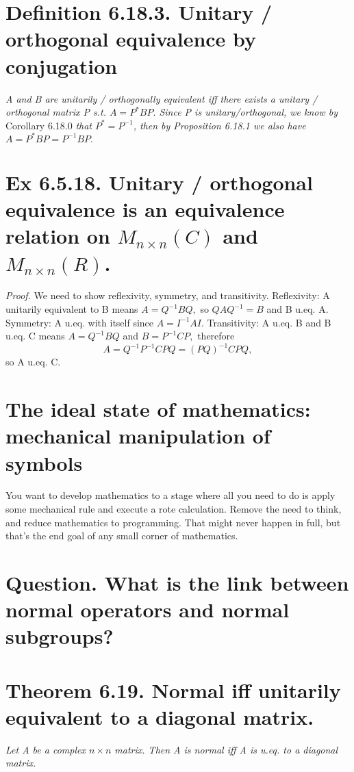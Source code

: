 \documentclass[12pt,english]{article}
\begin{document}
\section{Definition 6.18.3. Unitary / orthogonal equivalence by conjugation}

\emph{A and B are unitarily / orthogonally equivalent iff there exists
a unitary / orthogonal matrix P s.t. $A=P^{*}BP.$ Since P is unitary/orthogonal,
we know by }Corollary 6.18.0\emph{ that $P^{*}=P^{-1}$, then by Proposition
6.18.1 we also have $A=P^{*}BP=P^{-1}BP.$}

\section{Ex 6.5.18. Unitary / orthogonal equivalence is an equivalence relation
on $M_{n\times n}(C)$ and $M_{n\times n}(R)$. }

\emph{Proof. }We need to show reflexivity, symmetry, and transitivity.
Reflexivity: A unitarily equivalent to B means $A=Q^{-1}BQ,$ so $QAQ^{-1}=B$
and B u.eq. A. Symmetry: A u.eq. with itself since $A=I^{-1}AI.$
Transitivity: A u.eq. B and B u.eq. C means $A=Q^{-1}BQ$ and $B=P^{-1}CP,$
therefore
\[
A=Q^{-1}P^{-1}CPQ=(PQ)^{-1}CPQ,
\]
 so A u.eq. C.

\section{The ideal state of mathematics: mechanical manipulation of symbols}

You want to develop mathematics to a stage where all you need to do
is apply some mechanical rule and execute a rote calculation. Remove
the need to think, and reduce mathematics to programming. That might
never happen in full, but that's the end goal of any small corner
of mathematics.

\section{Question. What is the link between normal operators and normal subgroups?}

\section{Theorem 6.19. Normal iff unitarily equivalent to a diagonal matrix.}

\emph{Let A be a complex $n\times n$ matrix. Then A is normal iff
A is u.eq. to a diagonal matrix.}
\end{document}
